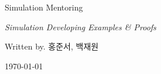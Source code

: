 \documentclass{book}  %
\begin{document}
\begin{titlepage}
    \centering
    \vspace*{\fill}  %

    {\Huge Simulation Mentoring \par}
    \vspace{0.5cm}
    {\Large \textit{Simulation Developing Examples \& Proofs} \par}
    \vspace{1cm}
    {\Large Written by. 홍준서, 백재원\par}

    \vspace*{\fill}  %

    {\large \today \par}
\end{titlepage}









\end{document}
